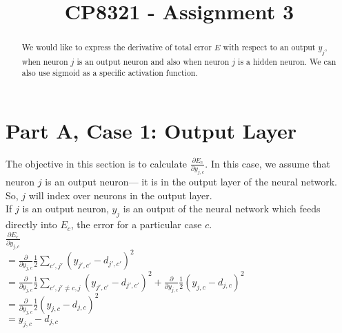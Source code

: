 \documentclass[conference]{IEEEtran}
\newcommand{\dd}[2]{\frac{\partial #1}{\partial #2}} %
\begin{document}
\title{CP8321 - Assignment 3\\
}

\author{
}

\maketitle



\begin{abstract}
We would like to express the derivative of total error $E$ with respect to an output $y_{j}$, when neuron $j$ is an output neuron and also when neuron $j$ is a hidden neuron. We can also use sigmoid as a specific activation function. 
\end{abstract}

\section{Part A, Case 1: Output Layer}

The objective in this section is to calculate $\dd{E_{c}}{y_{j, c}}$. In this case, we assume that neuron $j$ is an output neuron--- it is in the output layer of the neural network. So, $j$ will index over neurons in the output layer. \\

If $j$ is an output neuron, $y_{j}$ is an output of the neural network which feeds directly into $E_{c}$, the error for a particular case $c$. \\

$\dd{E_{c}}{y_{j,c}}$ \\

$= \dd{}{y_{j,c}} \frac{1}{2} \sum_{c',j'}(y_{j',c'} - d_{j',c'})^{2}$ \\

$= \dd{}{y_{j,c}} \frac{1}{2} \sum_{c',j' \neq c,j}(y_{j',c'} - d_{j',c'})^{2} + \dd{}{y_{j,c}} \frac{1}{2}(y_{j,c} - d_{j,c})^{2}$ \\

$= \dd{}{y_{j,c}} \frac{1}{2}(y_{j,c} - d_{j,c})^{2}$ \\

$= y_{j,c} - d_{j,c}$ \\
\end{document}
